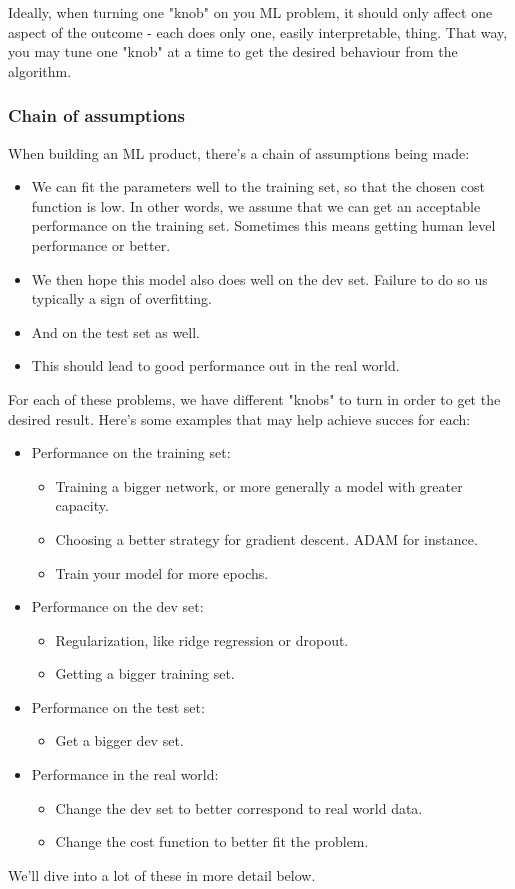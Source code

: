 \documentclass[12pt, a4paper]{article}
\numberwithin{equation}{section}
\begin{document}
Ideally, when turning one "knob" on you ML problem, it should only affect one aspect of the outcome - each does only one, easily interpretable, thing. That way, you may tune one "knob" at a time to get the desired behaviour from the algorithm.

\subsubsection{Chain of assumptions}
When building an ML product, there's a chain of assumptions being made:
\begin{itemize}
\item We can fit the parameters well to the training set, so that the chosen cost function is low. In other words, we assume that we can get an acceptable performance on the training set. Sometimes this means getting human level performance or better.
\item We then hope this model also does well on the dev set. Failure to do so us typically a sign of overfitting.
\item And on the test set as well.
\item This should lead to good performance out in the real world.
\end{itemize}
For each of these problems, we have different "knobs" to turn in order to get the desired result. Here's some examples that may help achieve succes for each:
\begin{itemize}
\item Performance on the training set:
	\begin{itemize}
	\item Training a bigger network, or more generally a model with greater capacity.
	\item Choosing a better strategy for gradient descent. ADAM for instance.
	\item Train your model for more epochs.
	\end{itemize}
\item Performance on the dev set:
	\begin{itemize}
	\item Regularization, like ridge regression or dropout.
	\item Getting a bigger training set.
	\end{itemize}
\item Performance on the test set:
	\begin{itemize}
	\item Get a bigger dev set.
	\end{itemize}
\item Performance in the real world:
	\begin{itemize}
	\item Change the dev set to better correspond to real world data.
	\item Change the cost function to better fit the problem.
	\end{itemize}
\end{itemize}
We'll dive into a lot of these in more detail below.
\end{document}
